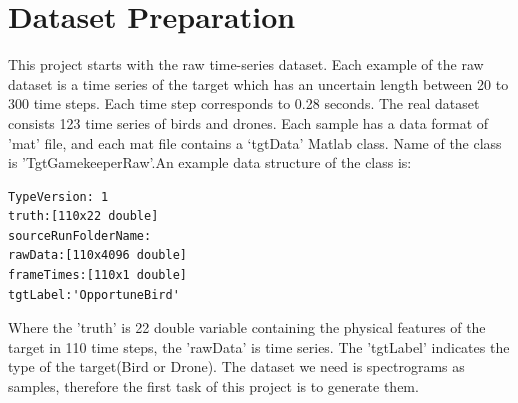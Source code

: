 \documentclass{cta-author}
\begin{document}
\section{Dataset Preparation}
This project starts with the raw time-series dataset. Each example of the raw dataset is a time series of the target which has an uncertain length between 20 to 300 time steps. Each time step corresponds to 0.28 seconds. The real dataset consists 123 time series of birds and drones. 
Each sample has a data format of 'mat' file, and each mat file contains a ‘tgtData’ Matlab class. Name of the class is 'TgtGamekeeperRaw'.An example data structure of the class is:
\lstset{language = Matlab}
\begin{lstlisting}
TypeVersion: 1
truth:[110x22 double]
sourceRunFolderName:
rawData:[110x4096 double]
frameTimes:[110x1 double]
tgtLabel:'OpportuneBird'
\end{lstlisting}
Where the 'truth' is 22 double variable containing the physical features of the target in 110 time steps, the 'rawData' is time series. The 'tgtLabel' indicates the type of the target(Bird or Drone). 
The dataset we need is spectrograms as samples, therefore the first task of this project is to generate them.
\end{document}
